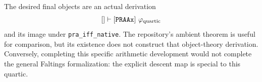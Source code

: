 The desired final objects are an actual derivation
\[
 []\vdash[\mathtt{PRAAx}]\ \varphi_{\rm quartic}
\]
and its image under \texttt{pra\_iff\_native}.  The repository's
ambient theorem 
is useful for comparison, but its existence does not construct that
object-theory derivation.  Conversely, completing this specific
arithmetic development would not complete the general Faltings
formalization: the explicit descent map is special to this quartic.
